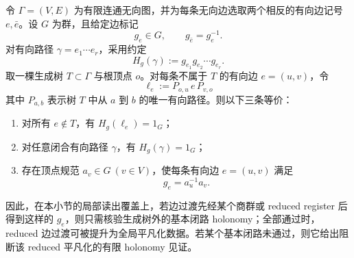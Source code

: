\begin{proposition}\label{prop:distill-gromov-physical-finite-reduced-holonomy-promotion-gate}
令 \(\Gamma=(V,E)\) 为有限连通无向图，并为每条无向边选取两个相反的有向边记号 \(e,\bar e\)。设 \(G\) 为群，且给定边标记
\[
g_e\in G,\qquad g_{\bar e}=g_e^{-1}.
\]
对有向路径 \(\gamma=e_1\cdots e_r\)，采用约定
\[
H_g(\gamma):=g_{e_1}g_{e_2}\cdots g_{e_r}.
\]
取一棵生成树 \(T\subset\Gamma\) 与根顶点 \(o\)。对每条不属于 \(T\) 的有向边 \(e=(u,v)\)，令
\[
\ell_e:=P_{o,u}\,e\,P_{v,o}
\]
其中 \(P_{a,b}\) 表示树 \(T\) 中从 \(a\) 到 \(b\) 的唯一有向路径。则以下三条等价：
\begin{enumerate}
  \item 对所有 \(e\notin T\)，有 \(H_g(\ell_e)=1_G\)；
  \item 对任意闭合有向路径 \(\gamma\)，有 \(H_g(\gamma)=1_G\)；
  \item 存在顶点规范 \(a_v\in G\ (v\in V)\)，使每条有向边 \(e=(u,v)\) 满足
  \[
  g_e=a_u^{-1}a_v.
  \]
\end{enumerate}
因此，在本小节的局部读出覆盖上，若边过渡先经某个商群或 reduced register 后得到这样的 \(g_e\)，则只需核验生成树外的基本闭路 holonomy；全部通过时，reduced 边过渡可被提升为全局平凡化数据。若某个基本闭路未通过，则它给出阻断该 reduced 平凡化的有限 holonomy 见证。
\end{proposition}

